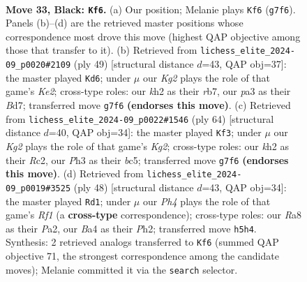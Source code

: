 \documentclass[11pt]{article}
\begin{document}
\clearpage

\begin{figure}[p]\centering
\begin{subfigure}{0.46\textwidth}\centering
\resizebox{\linewidth}{!}{%
\newchessgame
\chessboard[
  setfen={r7/pp3pk1/8/7p/bP2P3/P5Pp/3r1P1K/RBR5 b - - 3 33},
  showmover=false,
  pgfstyle=straightmove, color=movearrow, markmove={g7-f6}
]}
\caption{}
\end{subfigure}\hfill
\begin{subfigure}{0.46\textwidth}\centering
\resizebox{\linewidth}{!}{%
\newchessgame
\chessboard[
  setfen={8/pRpbk1pp/8/5p2/2BP3r/2P1P3/P5r1/2K1R3 b - - 3 25},
  showmover=false,
  pgfstyle=straightmove, color=movearrow, markmove={e7-d6}
]}
\caption{}
\end{subfigure}
\\[4pt]
\begin{subfigure}{0.46\textwidth}\centering
\resizebox{\linewidth}{!}{%
\newchessgame
\chessboard[
  setfen={r5k1/4B2p/3p2p1/p1b2p2/P4P2/8/1PR3KP/8 w - - 1 33},
  showmover=false,
  pgfstyle=straightmove, color=movearrow, markmove={g2-f3}
]}
\caption{}
\end{subfigure}\hfill
\begin{subfigure}{0.46\textwidth}\centering
\resizebox{\linewidth}{!}{%
\newchessgame
\chessboard[
  setfen={4r1k1/3r1ppp/8/pp1Pp3/8/4R3/PPP3PP/5R1K w - - 0 25},
  showmover=false,
  pgfstyle=straightmove, color=movearrow, markmove={f1-d1}
]}
\caption{}
\end{subfigure}
\caption{\textbf{Move 33, Black: \texttt{Kf6}.} (a) Our position; Melanie plays \texttt{Kf6} (\texttt{g7f6}). Panels (b)--(d) are the retrieved master positions whose correspondence most drove this move (highest QAP objective among those that transfer to it). (b) Retrieved from \texttt{lichess\_elite\_2024-09\_p0020\#2109} (ply 49) [structural distance $d$=43, QAP obj=37]: the master played \texttt{Kd6}; under $\mu$ our \emph{Kg2} plays the role of that game's \emph{Ke2}; cross-type roles: our \emph{k}h2 as their \emph{r}b7, our \emph{p}a3 as their \emph{B}d7; transferred move \texttt{g7f6} \textbf{(endorses this move)}. (c) Retrieved from \texttt{lichess\_elite\_2024-09\_p0022\#1546} (ply 64) [structural distance $d$=40, QAP obj=34]: the master played \texttt{Kf3}; under $\mu$ our \emph{Kg2} plays the role of that game's \emph{Kg2}; cross-type roles: our \emph{k}h2 as their \emph{R}c2, our \emph{P}h3 as their \emph{b}c5; transferred move \texttt{g7f6} \textbf{(endorses this move)}. (d) Retrieved from \texttt{lichess\_elite\_2024-09\_p0019\#3525} (ply 48) [structural distance $d$=43, QAP obj=34]: the master played \texttt{Rd1}; under $\mu$ our \emph{Ph4} plays the role of that game's \emph{Rf1} (a \textbf{cross-type} correspondence); cross-type roles: our \emph{R}a8 as their \emph{P}a2, our \emph{B}a4 as their \emph{P}h2; transferred move \texttt{h5h4}. Synthesis: 2 retrieved analogs transferred to \texttt{Kf6} (summed QAP objective 71, the strongest correspondence among the candidate moves); Melanie committed it via the \texttt{search} selector.}
\label{fig:thought-m65}
\end{figure}
\end{document}
